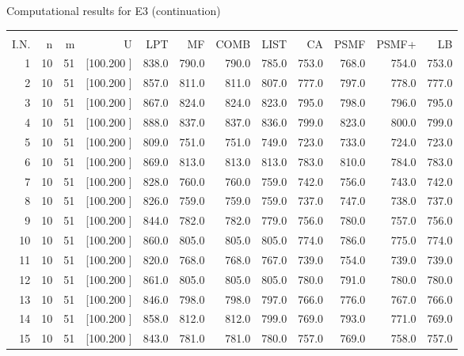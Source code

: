 \documentclass[12pt,a4paper]{article}
\begin{document}
\newpage
\begin{center}
 Computational results for E3 (continuation) {\tiny
\begin{tabular}{r r r r r r r r r r r r}\hline
    &   &   &          &        &        &        &        &        &        &        &       \\[-0.1in]
  I.N.  &  n  &  m  &  U  &  LPT  &  MF  &  COMB  &  LIST  &  CA  & PSMF &PSMF+ & LB \\[0.03in]
\hline
   1& 10& 51&[100.200   ]&   838.0&   790.0&   790.0&   785.0&   753.0&   768.0&   754.0&   753.0\\[-0.02in]
   2& 10& 51&[100.200   ]&   857.0&   811.0&   811.0&   807.0&   777.0&   797.0&   778.0&   777.0\\[-0.02in]
   3& 10& 51&[100.200   ]&   867.0&   824.0&   824.0&   823.0&   795.0&   798.0&   796.0&   795.0\\[-0.02in]
   4& 10& 51&[100.200   ]&   888.0&   837.0&   837.0&   836.0&   799.0&   823.0&   800.0&   799.0\\[-0.02in]
   5& 10& 51&[100.200   ]&   809.0&   751.0&   751.0&   749.0&   723.0&   733.0&   724.0&   723.0\\[-0.02in]
   6& 10& 51&[100.200   ]&   869.0&   813.0&   813.0&   813.0&   783.0&   810.0&   784.0&   783.0\\[-0.02in]
   7& 10& 51&[100.200   ]&   828.0&   760.0&   760.0&   759.0&   742.0&   756.0&   743.0&   742.0\\[-0.02in]
   8& 10& 51&[100.200   ]&   826.0&   759.0&   759.0&   759.0&   737.0&   747.0&   738.0&   737.0\\[-0.02in]
   9& 10& 51&[100.200   ]&   844.0&   782.0&   782.0&   779.0&   756.0&   780.0&   757.0&   756.0\\[-0.02in]
  10& 10& 51&[100.200   ]&   860.0&   805.0&   805.0&   805.0&   774.0&   786.0&   775.0&   774.0\\[-0.02in]
  11& 10& 51&[100.200   ]&   820.0&   768.0&   768.0&   767.0&   739.0&   754.0&   739.0&   739.0\\[-0.02in]
  12& 10& 51&[100.200   ]&   861.0&   805.0&   805.0&   805.0&   780.0&   791.0&   780.0&   780.0\\[-0.02in]
  13& 10& 51&[100.200   ]&   846.0&   798.0&   798.0&   797.0&   766.0&   776.0&   767.0&   766.0\\[-0.02in]
  14& 10& 51&[100.200   ]&   858.0&   812.0&   812.0&   799.0&   769.0&   793.0&   771.0&   769.0\\[-0.02in]
  15& 10& 51&[100.200   ]&   843.0&   781.0&   781.0&   780.0&   757.0&   769.0&   758.0&   757.0\\[-0.02in]

\end{tabular}}
\end{center}
\end{document}
